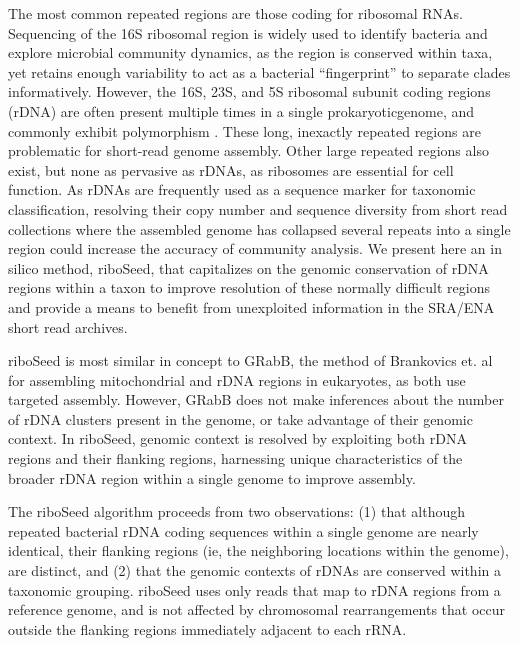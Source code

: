 \documentclass[11pt]{article}
\begin{document}
\begin{linenumbers}
The most common repeated regions are those coding for ribosomal RNAs. Sequencing of the 16S ribosomal region is widely used to identify bacteria and explore microbial community dynamics\cite{Weisburg1991,Clarridge2004,Woese1990,Case2007}, as the region is conserved within taxa, yet retains enough variability to act as a bacterial “fingerprint” to separate clades informatively. However, the 16S, 23S, and 5S ribosomal subunit coding regions (rDNA) are often present multiple times in a single prokaryoticgenome, and commonly exhibit polymorphism \cite{Coenye2003,Moreno2002,Lukjancenko2010,Větrovský2013}. These long, inexactly repeated regions\cite{Agrawal2016,Alkan2011} are problematic for short-read genome assembly. Other large repeated regions also exist, but none as pervasive as rDNAs, as ribosomes are essential for cell function. As rDNAs are frequently used as a sequence marker for taxonomic classification, resolving their copy number and sequence diversity from short read collections where the assembled genome has collapsed several repeats into a single region could increase the accuracy of community analysis. We present here an in silico method, riboSeed, that capitalizes on the genomic conservation of rDNA regions within a taxon to improve resolution of these normally difficult regions and provide a means to benefit from unexploited information in the SRA/ENA short read archives.


riboSeed is most similar in concept to GRabB, the method of Brankovics et. al \cite{Brankovics2016} for assembling mitochondrial and rDNA regions in eukaryotes, as both use targeted assembly. However, GRabB does not make inferences about the number of rDNA clusters present in the genome, or take advantage of their genomic context. In riboSeed, genomic context is resolved by exploiting both rDNA regions and their flanking regions, harnessing unique characteristics of the broader rDNA region within a single genome to improve assembly.


The riboSeed algorithm proceeds from two observations: (1) that although repeated bacterial rDNA coding sequences within a single genome are nearly identical, their flanking regions (ie, the neighboring locations within the genome), are distinct, and (2) that the genomic contexts of rDNAs  are conserved within a taxonomic grouping. riboSeed uses only reads that map to rDNA regions from a reference genome, and is not affected by chromosomal rearrangements that occur outside the flanking regions immediately adjacent to each rRNA.



\end{linenumbers}
\end{document}
